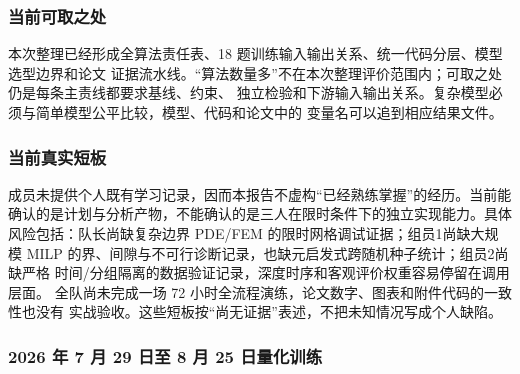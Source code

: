 \documentclass[UTF8,a4paper,12pt]{ctexart}
\begin{document}
\subsubsection{当前可取之处}

本次整理已经形成全算法责任表、18 题训练输入输出关系、统一代码分层、模型选型边界和论文
证据流水线。“算法数量多”不在本次整理评价范围内；可取之处仍是每条主责线都要求基线、约束、
独立检验和下游输入输出关系。复杂模型必须与简单模型公平比较，模型、代码和论文中的
变量名可以追到相应结果文件。

\subsubsection{当前真实短板}

成员未提供个人既有学习记录，因而本报告不虚构“已经熟练掌握”的经历。当前能
确认的是计划与分析产物，不能确认的是三人在限时条件下的独立实现能力。具体
风险包括：队长尚缺复杂边界 PDE/FEM 的限时网格调试证据；组员1尚缺大规模
MILP 的界、间隙与不可行诊断记录，也缺元启发式跨随机种子统计；组员2尚缺严格
时间/分组隔离的数据验证记录，深度时序和客观评价权重容易停留在调用层面。
全队尚未完成一场 72 小时全流程演练，论文数字、图表和附件代码的一致性也没有
实战验收。这些短板按“尚无证据”表述，不把未知情况写成个人缺陷。

\subsubsection{2026 年 7 月 29 日至 8 月 25 日量化训练}
\end{document}
